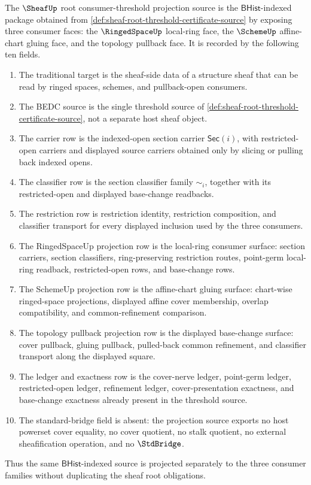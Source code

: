 \begin{definition}
\label{def:sheaf-root-consumer-threshold-projection-source}
The $\SheafUp$ root consumer-threshold projection source is the $\mathsf{BHist}$-indexed package obtained from \autoref{def:sheaf-root-threshold-certificate-source} by exposing three consumer faces: the $\RingedSpaceUp$ local-ring face, the $\SchemeUp$ affine-chart gluing face, and the topology pullback face. It is recorded by the following ten fields.
\begin{enumerate}
\item The traditional target is the sheaf-side data of a structure sheaf that can be read by ringed spaces, schemes, and pullback-open consumers.
\item The BEDC source is the single threshold source of \autoref{def:sheaf-root-threshold-certificate-source}, not a separate host sheaf object.
\item The carrier row is the indexed-open section carrier $\mathsf{Sec}(i)$, with restricted-open carriers and displayed source carriers obtained only by slicing or pulling back indexed opens.
\item The classifier row is the section classifier family $\sim_i$, together with its restricted-open and displayed base-change readbacks.
\item The restriction row is restriction identity, restriction composition, and classifier transport for every displayed inclusion used by the three consumers.
\item The RingedSpaceUp projection row is the local-ring consumer surface: section carriers, section classifiers, ring-preserving restriction routes, point-germ local-ring readback, restricted-open rows, and base-change rows.
\item The SchemeUp projection row is the affine-chart gluing surface: chart-wise ringed-space projections, displayed affine cover membership, overlap compatibility, and common-refinement comparison.
\item The topology pullback projection row is the displayed base-change surface: cover pullback, gluing pullback, pulled-back common refinement, and classifier transport along the displayed square.
\item The ledger and exactness row is the cover-nerve ledger, point-germ ledger, restricted-open ledger, refinement ledger, cover-presentation exactness, and base-change exactness already present in the threshold source.
\item The standard-bridge field is absent: the projection source exports no host powerset cover equality, no cover quotient, no stalk quotient, no external sheafification operation, and no $\StdBridge$.
\end{enumerate}
Thus the same $\mathsf{BHist}$-indexed source is projected separately to the three consumer families without duplicating the sheaf root obligations.
\end{definition}

